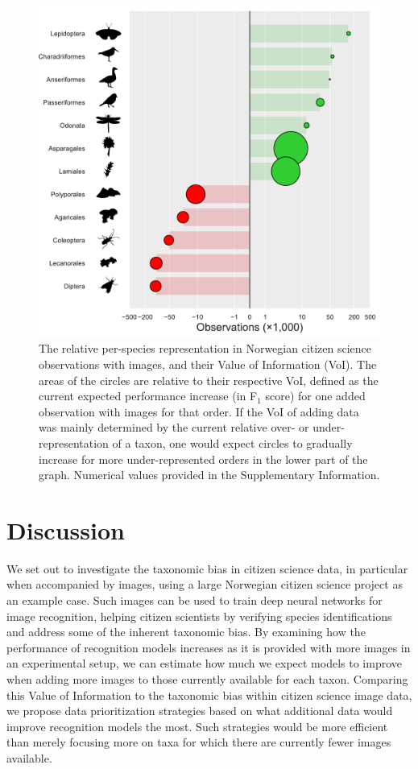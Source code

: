 \documentclass{article}
\begin{document}
\begin{figure}[!ht]
  \includegraphics[width=\textwidth]{4}
  \caption{\footnotesize The relative per-species representation in Norwegian citizen science observations with images, and their Value of Information (VoI). The areas of the circles are relative to their respective VoI, defined as the current expected performance increase (in F\(_1\) score) for one added observation with images for that order. If the VoI of adding data was mainly determined by the current relative over- or under-representation of a taxon, one would expect circles to gradually increase for more under-represented orders in the lower part of the graph. Numerical values provided in the Supplementary Information.}
  \label{fig:VoI_vs_bias}
\end{figure}

\section*{Discussion}
We set out to investigate the taxonomic bias in citizen science data, in particular when accompanied by images, using a large Norwegian citizen science project as an example case. Such images can be used to train deep neural networks for image recognition, helping citizen scientists by verifying species identifications and address some of the inherent taxonomic bias. By examining how the performance of recognition models increases as it is provided with more images in an experimental setup, we can estimate how much we expect models to improve when adding more images to those currently available for each taxon. Comparing this Value of Information to the taxonomic bias within citizen science image data, we propose data prioritization strategies based on what additional data would improve recognition models the most. Such strategies would be more efficient than merely focusing more on taxa for which there are currently fewer images available.
\end{document}
